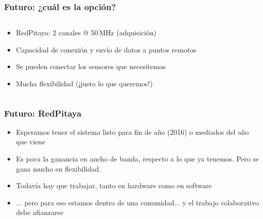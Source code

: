 \documentclass{beamer}
\begin{document}
\begin{frame}
	\frametitle{Futuro: ¿cuál es la opción?}
	\begin{columns}
		\begin{column}{0.40\textwidth}
			\begin{block}{}
	    	\begin{itemize}[<+->]
	      	\item RedPitaya: 2 canales @ 50\,MHz (adquisición)
	      	\item Capacidad de conexión y envío de datos a puntos remotos
	      	\item Se pueden conectar los sensores que necesitemos 
					\item Mucha \alert{flexibilidad} (¡justo lo que queremos!)
	    	\end{itemize}
			\end{block}
		\end{column} 
	 	\begin{column}{0.55\textwidth}
	 \end{column}
	\end{columns}
\end{frame} 

\begin{frame}
	\frametitle{Futuro: RedPitaya}
		\begin{block}{}
	  	\begin{itemize}
	    	\item Esperamos tener el sistema listo para fin de año (2016) o mediados
							del año que viene
	    	\item Es poca la ganancia en ancho de banda, respecto a lo que ya
							tenemos. Pero se gana mucho en flexibilidad.
	    	\item Todavía hay que trabajar, tanto en hardware como en software
				\item ... pero para eso estamos dentro de una comunidad... y el \alert{trabajo
							colaborativo} debe afianzarse
	  	\end{itemize}
		\end{block}
\end{frame} 
\end{document}
